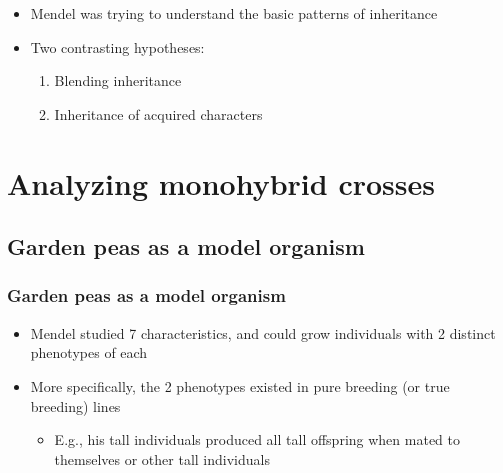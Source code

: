 \begin{frame}

    \begin{itemize}
        \item<1-> Mendel was trying to understand the basic patterns of inheritance

        \item<2-> Two contrasting hypotheses:
            \begin{enumerate}
                \item<2-> Blending inheritance

                \item<2-> Inheritance of acquired characters
            \end{enumerate}

    \end{itemize}
\end{frame}

\section{Analyzing monohybrid crosses}

\subsection{Garden peas as a model organism}

\begin{frame}[t]
    \frametitle{Garden peas as a model organism}

    \begin{itemize}
        \item<1-> Mendel studied 7 characteristics, and could grow individuals with
            2 distinct phenotypes of each

        \item<2-> More specifically, the 2 phenotypes existed in pure breeding (or
            true breeding) lines
            \begin{itemize}
                \item<2-> E.g., his tall individuals produced all tall offspring
                    when mated to themselves or other tall individuals
            \end{itemize}
    \end{itemize}
\end{frame}

